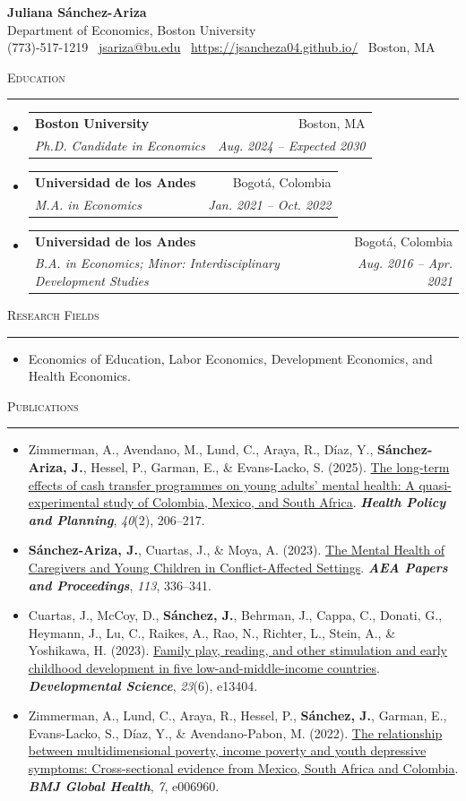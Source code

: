 \documentclass[11pt,letterpaper]{article}
\makeatletter
\newcommand{\cvsection}[1]{%
  \vspace{11pt}%
  {\Large\scshape #1\par}%
  \vspace{3pt}\hrule\vspace{6pt}%
}
\newcommand{\entryliststart}{%
  \begin{itemize}[leftmargin=0.15in,label={},topsep=0pt,partopsep=0pt,
                  itemsep=0pt,parsep=0pt]
}
\newcommand{\entrylistend}{\end{itemize}}
\newcommand{\cventry}[4]{%
  \item
  \begin{tabular*}{0.97\textwidth}[t]{@{}p{0.71\textwidth}@{\extracolsep{\fill}}r@{}}
    {\raggedright\large\bfseries #1} & {\large #2} \\
    {\raggedright\itshape #3} & {\itshape #4} \\
  \end{tabular*}\vspace{2pt}%
}
\newcommand{\cvtextliststart}{%
  \begin{itemize}[leftmargin=0.15in,label={},topsep=0pt,partopsep=0pt,
                  itemsep=0pt,parsep=0pt]
}
\newcommand{\cvtextitem}[1]{\item #1\vspace{3pt}}
\newcommand{\cvtextlistend}{\end{itemize}}
\makeatother
\begin{document}
\begin{center}
  {\Huge\bfseries Juliana S\'anchez-Ariza}\\[-1pt]
  {\large Department of Economics, Boston University}\\[-1pt]
  (773)-517-1219 \textbar\ 
  \href{mailto:jsariza@bu.edu}{jsariza@bu.edu}
  \textbar\ 
  \href{https://jsancheza04.github.io/}{https://jsancheza04.github.io/}
  \textbar\ Boston, MA
\end{center}
\vspace{1pt}

\cvsection{Education}
\entryliststart
  \cventry{Boston University}{Boston, MA}
    {Ph.D. Candidate in Economics}
    {Aug. 2024 -- Expected 2030}
  \cventry{Universidad de los Andes}{Bogot\'a, Colombia}
    {M.A. in Economics}
    {Jan. 2021 -- Oct. 2022}
  \cventry{Universidad de los Andes}{Bogot\'a, Colombia}
    {B.A. in Economics; Minor: Interdisciplinary Development Studies}
    {Aug. 2016 -- Apr. 2021}
\entrylistend

\cvsection{Research Fields}
\cvtextliststart
  \cvtextitem{Economics of Education, Labor Economics, Development Economics, and Health Economics.}
\cvtextlistend

\cvsection{Publications}
\cvtextliststart
  \cvtextitem{Zimmerman, A., Avendano, M., Lund, C., Araya, R., D\'iaz, Y., \textbf{S\'anchez-Ariza, J.}, Hessel, P., Garman, E., \& Evans-Lacko, S. (2025). \href{https://doi.org/10.1093/heapol/czae102}{The long-term effects of cash transfer programmes on young adults' mental health: A quasi-experimental study of Colombia, Mexico, and South Africa}. \textbf{\textit{Health Policy and Planning}}, \textit{40}(2), 206--217.}
  \cvtextitem{\textbf{S\'anchez-Ariza, J.}, Cuartas, J., \& Moya, A. (2023). \href{https://doi.org/10.1257/pandp.20231017}{The Mental Health of Caregivers and Young Children in Conflict-Affected Settings}. \textbf{\textit{AEA Papers and Proceedings}}, \textit{113}, 336--341.}
  \cvtextitem{Cuartas, J., McCoy, D., \textbf{S\'anchez, J.}, Behrman, J., Cappa, C., Donati, G., Heymann, J., Lu, C., Raikes, A., Rao, N., Richter, L., Stein, A., \& Yoshikawa, H. (2023). \href{https://doi.org/10.1111/desc.13404}{Family play, reading, and other stimulation and early childhood development in five low-and-middle-income countries}. \textbf{\textit{Developmental Science}}, \textit{23}(6), e13404.}
  \cvtextitem{Zimmerman, A., Lund, C., Araya, R., Hessel, P., \textbf{S\'anchez, J.}, Garman, E., Evans-Lacko, S., D\'iaz, Y., \& Avendano-Pabon, M. (2022). \href{https://gh.bmj.com/content/7/1/e006960}{The relationship between multidimensional poverty, income poverty and youth depressive symptoms: Cross-sectional evidence from Mexico, South Africa and Colombia}. \textbf{\textit{BMJ Global Health}}, \textit{7}, e006960.}
\cvtextlistend
\end{document}

